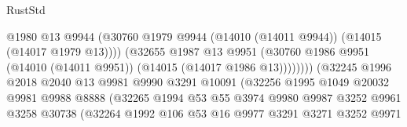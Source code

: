 \begin{lexlean}{RustStd}
\begin{coremodule}
                                            @1980
                                            @13
                                            @9944
                                            (@30760
                                              @1979
                                              @9944
                                              (@14010 (@14011 @9944))
                                              (@14015 (@14017 @1979 @13))))
                                          (@32655
                                            @1987
                                            @13
                                            @9951
                                            (@30760
                                              @1986
                                              @9951
                                              (@14010 (@14011 @9951))
                                              (@14015 (@14017 @1986 @13))))))))
                                  (@32245
                                    @1996
                                    @2018
                                    @2040
                                    @13
                                    @9981
                                    @9990
                                    @3291
                                    @10091
                                    (@32256
                                      @1995
                                      @1049
                                      @20032
                                      @9981
                                      @9988
                                      @8888
                                      (@32265
                                        @1994
                                        @53
                                        @55
                                        @3974
                                        @9980
                                        @9987
                                        @3252
                                        @9961
                                        @3258
                                        @30738
                                        (@32264
                                          @1992
                                          @106
                                          @53
                                          @16
                                          @9977
                                          @3291
                                          @3271
                                          @3252
                                          @9971

\end{coremodule}
\end{lexlean}
